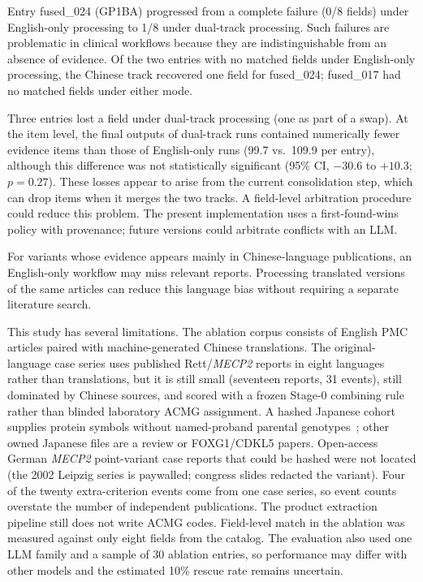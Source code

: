 \documentclass[preprint,12pt]{elsarticle}
\begin{document}
Entry fused\_024 (GP1BA) progressed from a
complete failure (0/8 fields) under English-only processing to 1/8 under
dual-track processing. Such failures are problematic in clinical
workflows because they are indistinguishable from an absence of evidence.
Of the two entries with no matched fields under English-only processing,
the Chinese track recovered one field for fused\_024; fused\_017 had no
matched fields under either mode.

Three entries lost a field under
dual-track processing (one as part of a swap). At the item level, the
final outputs of dual-track runs contained numerically fewer evidence
items than those of English-only runs (99.7 vs.\ 109.9 per entry),
although this difference was not statistically significant (95\% CI,
$-30.6$ to $+10.3$; $p = 0.27$). These losses appear to arise from the
current consolidation step, which can drop items when it merges the two
tracks. A field-level arbitration procedure could reduce this problem.
The present implementation uses a first-found-wins policy with
provenance; future versions could arbitrate conflicts with an LLM.

For variants whose evidence appears mainly in Chinese-language
publications, an English-only workflow may miss relevant reports.
Processing translated versions of the same articles can reduce this
language bias without requiring a separate literature search.

This study has several limitations. The ablation corpus consists of
English PMC articles paired with machine-generated Chinese translations.
The original-language case series uses published Rett/\textit{MECP2}
reports in eight languages rather than translations, but it is still
small (seventeen reports, 31 events), still dominated by Chinese sources,
and scored with a frozen Stage-0 combining rule rather than blinded
laboratory ACMG assignment. A hashed Japanese cohort supplies protein
symbols without named-proband parental genotypes~\cite{kondo2002}; other
owned Japanese files are a review or FOXG1/CDKL5 papers. Open-access
German \textit{MECP2} point-variant case reports that could be hashed
were not located (the 2002 Leipzig series is paywalled; congress slides
redacted the variant). Four of the twenty extra-criterion events come from one case series, so event
counts overstate the number of independent publications. The product extraction pipeline still does not
write ACMG codes. Field-level match in the ablation was measured against
only eight fields from the catalog. The evaluation also used one LLM
family and a sample of 30 ablation entries, so performance may differ
with other models and the estimated 10\% rescue rate remains uncertain.
\end{document}
